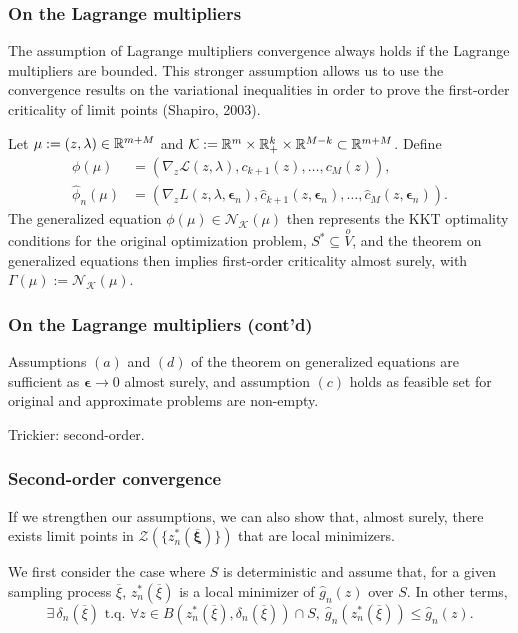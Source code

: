 \documentclass{beamer}
\def\bxi{\boldsymbol\xi}
\def\bepsilon{\boldsymbol\epsilon}
\begin{document}
\begin{frame}
\frametitle{On the Lagrange multipliers}

The assumption of Lagrange multipliers convergence always holds if the Lagrange multipliers are bounded.
This stronger assumption allows us to use the convergence results on the variational inequalities in order to prove the first-order criticality of limit points (Shapiro, 2003).

\mbox{}

Let $\mu := (z,\lambda) \in \mathbb{R}^{m+M}$ and $\mathcal{K} := \mathbb{R}^m
\times \mathbb{R}^k_+ \times \mathbb{R}^{M-k} \subset \mathbb{R}^{m+M}$.
Define
\begin{align*}
\phi(\mu) &= \left( \nabla_z \mathcal{L}(z, \lambda), c_{k+1}(z),
\ldots, c_M(z) \right),\\
\hat{\phi}_n(\mu) &= \left( \nabla_z L(z, \lambda, \bepsilon_n),
\hat{c}_{k+1}(z, \bepsilon_n), \ldots, \hat{c}_{M}(z,
\bepsilon_n)\right).
\end{align*}
The generalized equation $\phi(\mu) \in \mathcal{N}_{\mathcal{K}}(\mu)$ then represents the KKT optimality conditions for the original optimization problem, $S^* \subseteq \overset{o}{V}$, and the theorem on generalized equations then implies first-order criticality almost surely, with $\Gamma(\mu) := \mathcal{N}_{\mathcal{K}}(\mu)$.

\end{frame}

\begin{frame}
\frametitle{On the Lagrange multipliers (cont'd)}

Assumptions $(a)$ and $(d)$ of the theorem on generalized equations are sufficient as $\bepsilon \rightarrow 0$ almost surely, and assumption $(c)$ holds as feasible set for original and approximate problems are non-empty.

\mbox{}

Trickier: second-order.

\end{frame}

\begin{frame}
\frametitle{Second-order convergence}

If we strengthen our assumptions, we can also show that, almost surely, there exists limit points in $\mathcal{Z}\left(\lbrace z^*_n(\overline{\bxi})\rbrace\right)$ that are local minimizers.

\mbox{}

We first consider the case where $S$ is deterministic and assume that, for a given sampling process $\overline{\xi}$, $z_n^*(\overline{\xi})$ is a local minimizer of $\hat{g}_n(z)$ over $S$.
In other terms,
\[
\exists\, \delta_n(\overline{\xi}) \text{ t.q. } \forall z \in
B \left( z_n^*(\overline{\xi}), \delta_n(\overline{\xi}) \right) \cap
S,\ \hat{g}_n \left( z_n^*(\overline{\xi}) \right) \leq \hat{g}_n(z).
\]

\end{frame}
\end{document}
